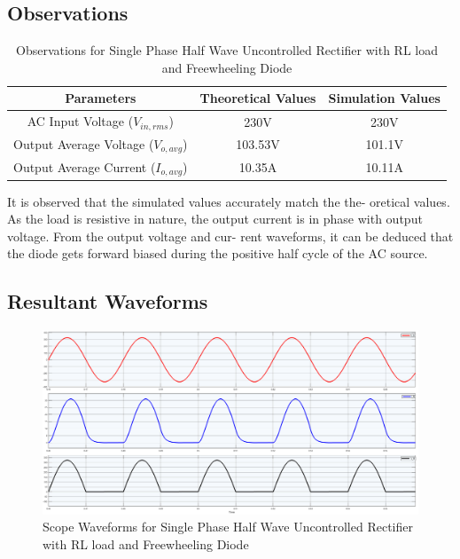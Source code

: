 \subsection{Observations}

\begin{table}[h]
    \renewcommand{\arraystretch}{1.3}
    \caption{Observations for Single Phase Half Wave Uncontrolled Rectifier with RL load and Freewheeling Diode}
    \label{table_observation_3}
    \centering
    \begin{tabular}{|c|c|c|}
        \hline
        Parameters                              & Theoretical Values & Simulation Values \\
        \hline
        \hline
        AC Input Voltage ($ V_{in,rms} $)       & 230V               & 230V              \\
        \hline
        Output Average Voltage ($ V_{o,avg} $)  & 103.53V            & 101.1V            \\
        \hline
        Output Average Current ($ I_{o,avg}  $) & 10.35A             & 10.11A            \\
        \hline
    \end{tabular}
\end{table}



It is observed that the simulated values accurately match the the-
oretical values. As the load is resistive in nature, the output current
is in phase with output voltage. From the output voltage and cur-
rent waveforms, it can be deduced that the diode gets forward biased
during the positive half cycle of the AC source.

\pagebreak

\subsection{Resultant Waveforms}


\begin{figure}[h]
    \centering
    \includegraphics[width=1\textwidth]{images/experiment-1/circuit-scope-simulation-03.png}
    \caption{Scope Waveforms for Single Phase Half Wave Uncontrolled Rectifier with RL load and Freewheeling Diode}
    \label{Fig_waveform_single-phase-half-wave-uncontrolled-rectifier-with-RL-load-and-freewheeling-diode}
\end{figure}


\pagebreak

